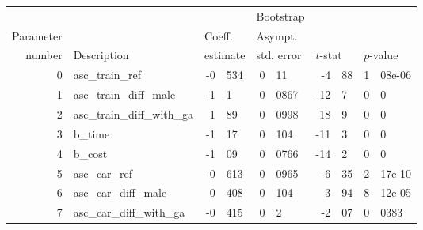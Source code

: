 \documentclass{article}
\begin{document}
\begin{tabular}{rlr@{.}lr@{.}lr@{.}lr@{.}l}
          &              &   \multicolumn{2}{l}{}         & \multicolumn{2}{l}{Bootstrap}  &  \multicolumn{4}{l}{}  \\
Parameter &              &   \multicolumn{2}{l}{Coeff.}   & \multicolumn{2}{l}{Asympt.}       & \multicolumn{4}{l}{}   \\
number    &  Description &   \multicolumn{2}{l}{estimate} & \multicolumn{2}{l}{std. error}    & \multicolumn{2}{l}{$t$-stat}  &  \multicolumn{2}{l}{$p$-value} \\
\hline
0 & asc\_train\_ref & -0&534 & 0&11 & -4&88 & 1&08e-06 \\ 
1 & asc\_train\_diff\_male & -1&1 & 0&0867 & -12&7 & 0&0 \\ 
2 & asc\_train\_diff\_with\_ga & 1&89 & 0&0998 & 18&9 & 0&0 \\ 
3 & b\_time & -1&17 & 0&104 & -11&3 & 0&0 \\ 
4 & b\_cost & -1&09 & 0&0766 & -14&2 & 0&0 \\ 
5 & asc\_car\_ref & -0&613 & 0&0965 & -6&35 & 2&17e-10 \\ 
6 & asc\_car\_diff\_male & 0&408 & 0&104 & 3&94 & 8&12e-05 \\ 
7 & asc\_car\_diff\_with\_ga & -0&415 & 0&2 & -2&07 & 0&0383 \\ 

\end{tabular}
\end{document}
